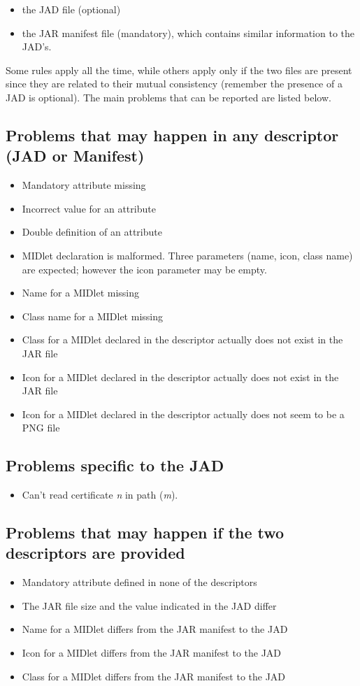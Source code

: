 \begin{itemize}
\item the JAD file (optional)
\item the JAR manifest file (mandatory), which contains similar information to the
  JAD's.
\end{itemize}

Some rules apply all the time, while others apply only if
the two files are present since they are related to their mutual
consistency (remember the presence of a JAD is optional). The main
problems that can be reported are listed below.


\subsection{Problems that may happen in any descriptor (JAD or
  Manifest)}
\begin{itemize}
\item Mandatory attribute missing
\item Incorrect value for an attribute
\item Double definition of an attribute
\item MIDlet declaration is malformed. Three parameters (name, icon,
  class name) are expected; however the icon parameter may be empty.
\item Name for a MIDlet missing
\item Class name for a MIDlet missing
\item Class for a MIDlet declared in the descriptor actually does not exist
  in the JAR file
\item Icon for a MIDlet declared in the descriptor actually does not exist
  in the JAR file
\item Icon for a MIDlet declared in the descriptor actually does not seem to
  be a PNG file 
\end{itemize}

\subsection{Problems specific to the JAD}
\begin{itemize}
\item Can't read certificate \emph{n} in path (\emph{m}).
\end{itemize}

\subsection{Problems that may happen if the two descriptors are provided}
\begin{itemize}
\item Mandatory attribute defined in none of the descriptors
\item The JAR file size and the value indicated in the JAD differ
\item Name for a MIDlet differs from the JAR manifest to the JAD
\item Icon for a MIDlet differs from the JAR manifest to the JAD
\item Class for a MIDlet differs from the JAR manifest to the JAD
\end{itemize}

